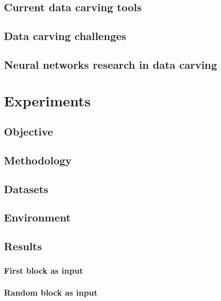     \subsection{Current data carving tools}
    
    \subsection{Data carving challenges}
    
    \subsection{Neural networks research in data carving}
    
% 
% 
% 
\section{\label{chap:experiments}Experiments}


    \subsection{Objective}
    
    \subsection{Methodology}
    
    \subsection{Datasets}
    
    \subsection{Environment}
    
    \subsection{Results}
    
        \subsubsection{First block as input}
        
        \subsubsection{Random block as input}
        
